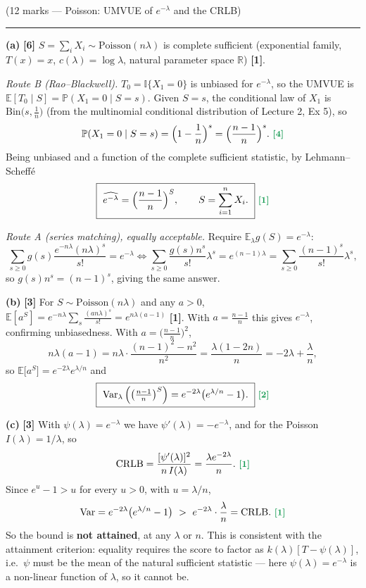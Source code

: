 \documentclass[11pt]{article}
\newcommand{\E}{\mathbb{E}}
\newcommand{\Var}{\operatorname{Var}}
\newcommand{\Prob}{\mathbb{P}}
\newcommand{\R}{\mathbb{R}}
\newcommand{\I}{\mathbb{I}}
\newcommand{\mk}[1]{{\small\color{ForestGreen}\textbf{[#1]}}}
\newcommand{\qhead}[2]{\bigskip\noindent{\large\bfseries Question #1}\quad\textnormal{\small(#2)}\par
  \vspace{2pt}\hrule\vspace{6pt}}
\begin{document}
\qhead{3}{12 marks --- Poisson: UMVUE of $e^{-\lambda}$ and the CRLB}

\noindent\textbf{(a)} \mk{6}
$S=\sum_iX_i\sim\mathrm{Poisson}(n\lambda)$ is complete sufficient (exponential family,
$T(x)=x$, $c(\lambda)=\log\lambda$, natural parameter space $\R$) \mk{1}.

\emph{Route B (Rao--Blackwell).} $T_0=\I\{X_1=0\}$ is unbiased for $e^{-\lambda}$, so the
UMVUE is $\E[T_0\mid S]=\Prob(X_1=0\mid S=s)$. Given $S=s$, the conditional law of $X_1$ is
$\mathrm{Bin}\big(s,\tfrac1n\big)$ (from the multinomial conditional distribution of Lecture 2,
Ex 5), so
\[
\Prob(X_1=0\mid S=s)=\Big(1-\frac1n\Big)^{s}=\Big(\frac{n-1}{n}\Big)^{s}. \ \mk{4}
\]
Being unbiased and a function of the complete sufficient statistic, by Lehmann--Scheff\'e
\[
\boxed{\ \widehat{e^{-\lambda}}=\Big(\frac{n-1}{n}\Big)^{S},\qquad S=\sum_{i=1}^nX_i.\ }\ \mk{1}
\]

\emph{Route A (series matching), equally acceptable.} Require
$\E_\lambda g(S)=e^{-\lambda}$:
\[
\sum_{s\ge0}g(s)\frac{e^{-n\lambda}(n\lambda)^{s}}{s!}=e^{-\lambda}
\iff
\sum_{s\ge0}\frac{g(s)n^{s}}{s!}\lambda^{s}=e^{(n-1)\lambda}=\sum_{s\ge0}\frac{(n-1)^{s}}{s!}\lambda^{s},
\]
so $g(s)n^{s}=(n-1)^{s}$, giving the same answer.

\smallskip\noindent\textbf{(b)} \mk{3}
For $S\sim\mathrm{Poisson}(n\lambda)$ and any $a>0$,
$\E[a^{S}]=e^{-n\lambda}\sum_s\frac{(an\lambda)^s}{s!}=e^{n\lambda(a-1)}$ \mk{1}.
With $a=\frac{n-1}{n}$ this gives $e^{-\lambda}$, confirming unbiasedness. With
$a=\big(\frac{n-1}{n}\big)^{2}$,
\[
n\lambda(a-1)=n\lambda\cdot\frac{(n-1)^2-n^2}{n^{2}}=\frac{\lambda(1-2n)}{n}
=-2\lambda+\frac{\lambda}{n},
\]
so $\E\big[a^{S}\big]=e^{-2\lambda}e^{\lambda/n}$ and
\[
\boxed{\ \Var_\lambda\Big(\big(\tfrac{n-1}{n}\big)^{S}\Big)=e^{-2\lambda}\big(e^{\lambda/n}-1\big).\ }\ \mk{2}
\]

\smallskip\noindent\textbf{(c)} \mk{3}
With $\psi(\lambda)=e^{-\lambda}$ we have $\psi'(\lambda)=-e^{-\lambda}$, and for the Poisson
$I(\lambda)=1/\lambda$, so
\[
\text{CRLB}=\frac{[\psi'(\lambda)]^{2}}{n\,I(\lambda)}=\frac{\lambda e^{-2\lambda}}{n}. \ \mk{1}
\]
Since $e^{u}-1>u$ for every $u>0$, with $u=\lambda/n$,
\[
\Var=e^{-2\lambda}\big(e^{\lambda/n}-1\big)\ >\ e^{-2\lambda}\cdot\frac{\lambda}{n}=\text{CRLB}. \ \mk{1}
\]
So the bound is \textbf{not attained}, at any $\lambda$ or $n$. This is consistent with the
attainment criterion: equality requires the score to factor as
$k(\lambda)[T-\psi(\lambda)]$, i.e.\ $\psi$ must be the mean of the natural sufficient
statistic --- here $\psi(\lambda)=e^{-\lambda}$ is a non-linear function of $\lambda$, so it
cannot be.
\end{document}
